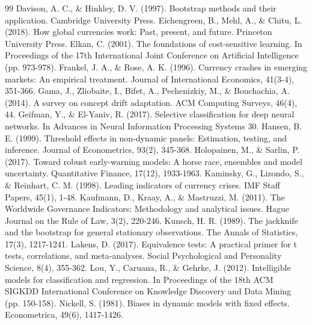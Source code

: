 \documentclass[preprint,12pt,authoryear]{elsarticle}
\begin{document}
\begin{thebibliography}{99}
 Davison, A. C., \& Hinkley, D. V. (1997). Bootstrap methods and their application. Cambridge University Press.
 Eichengreen, B., Mehl, A., \& Chitu, L. (2018). How global currencies work: Past, present, and future. Princeton University Press.
 Elkan, C. (2001). The foundations of cost-sensitive learning. In Proceedings of the 17th International Joint Conference on Artificial Intelligence (pp. 973-978).
 Frankel, J. A., \& Rose, A. K. (1996). Currency crashes in emerging markets: An empirical treatment. Journal of International Economics, 41(3-4), 351-366.
 Gama, J., Zliobaite, I., Bifet, A., Pechenizkiy, M., \& Bouchachia, A. (2014). A survey on concept drift adaptation. ACM Computing Surveys, 46(4), 44.
 Geifman, Y., \& El-Yaniv, R. (2017). Selective classification for deep neural networks. In Advances in Neural Information Processing Systems 30.
 Hansen, B. E. (1999). Threshold effects in non-dynamic panels: Estimation, testing, and inference. Journal of Econometrics, 93(2), 345-368.
 Holopainen, M., \& Sarlin, P. (2017). Toward robust early-warning models: A horse race, ensembles and model uncertainty. Quantitative Finance, 17(12), 1933-1963.
 Kaminsky, G., Lizondo, S., \& Reinhart, C. M. (1998). Leading indicators of currency crises. IMF Staff Papers, 45(1), 1-48.
 Kaufmann, D., Kraay, A., \& Mastruzzi, M. (2011). The Worldwide Governance Indicators: Methodology and analytical issues. Hague Journal on the Rule of Law, 3(2), 220-246.
 Kunsch, H. R. (1989). The jackknife and the bootstrap for general stationary observations. The Annals of Statistics, 17(3), 1217-1241.
 Lakens, D. (2017). Equivalence tests: A practical primer for t tests, correlations, and meta-analyses. Social Psychological and Personality Science, 8(4), 355-362.
 Lou, Y., Caruana, R., \& Gehrke, J. (2012). Intelligible models for classification and regression. In Proceedings of the 18th ACM SIGKDD International Conference on Knowledge Discovery and Data Mining (pp. 150-158).
 Nickell, S. (1981). Biases in dynamic models with fixed effects. Econometrica, 49(6), 1417-1426.

\end{thebibliography}
\end{document}
